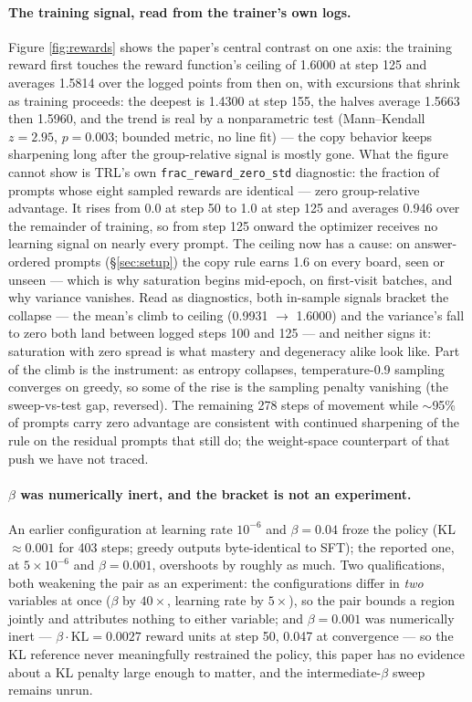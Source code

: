 \documentclass{article}
\begin{document}
\paragraph{The training signal, read from the trainer's own logs.} Figure
\ref{fig:rewards} shows the paper's central contrast on one axis: the
training reward first touches the reward function's ceiling of 1.6000 at step
125 and averages 1.5814 over the logged points from then on, with
excursions that shrink as training proceeds: the deepest is 1.4300 at
step 155, the halves average 1.5663 then 1.5960, and the trend is real by a
nonparametric test (Mann--Kendall $z=2.95$, $p=0.003$; bounded metric, no
line fit) --- the copy behavior keeps sharpening
long after the group-relative signal is mostly gone. What the figure cannot show is TRL's own
\texttt{frac\_reward\_zero\_std} diagnostic: the fraction of prompts whose
eight sampled rewards are identical --- zero group-relative
advantage. It rises from 0.0 at step 50 to 1.0 at step 125
and averages 0.946 over the remainder of training, so from step 125 onward
the optimizer receives no learning signal on nearly every prompt. The
ceiling now has a cause: on answer-ordered prompts (\S\ref{sec:setup}) the
copy rule earns 1.6 on every board, seen or unseen --- which is why
saturation begins mid-epoch, on first-visit batches, and why variance
vanishes. Read as
diagnostics, both in-sample signals bracket the collapse --- the mean's
climb to ceiling (0.9931 $\to$ 1.6000) and the variance's fall to zero both land between logged steps 100 and 125 ---
and neither signs it: saturation with zero spread is what mastery and
degeneracy alike look like. Part of the climb is the instrument: as entropy
collapses, temperature-0.9 sampling converges on greedy, so some of the
rise is the sampling penalty vanishing (the sweep-vs-test gap, reversed). The remaining 278 steps of movement while $\sim$95\% of
prompts carry zero advantage are consistent with continued sharpening of
the rule on the residual prompts that still do; the weight-space
counterpart of that push we have not traced.

\paragraph{$\beta$ was numerically inert, and the bracket is not an
experiment.} An earlier configuration at learning rate $10^{-6}$ and
$\beta=0.04$ froze the policy (KL $\approx 0.001$ for 403 steps; greedy
outputs byte-identical to SFT); the reported one, at $5\times10^{-6}$ and
$\beta=0.001$, overshoots by roughly as much. Two qualifications, both
weakening the pair as an experiment: the configurations differ in
\emph{two} variables at once ($\beta$ by $40\times$, learning rate by
$5\times$), so the pair bounds a region jointly and attributes nothing to
either variable; and $\beta=0.001$ was numerically inert --- $\beta \cdot
\mathrm{KL} = 0.0027$ reward units at step 50, 0.047 at convergence --- so
the KL reference never meaningfully restrained the policy, this paper has
no evidence about a KL penalty large enough to matter, and the
intermediate-$\beta$ sweep remains unrun.
\end{document}
